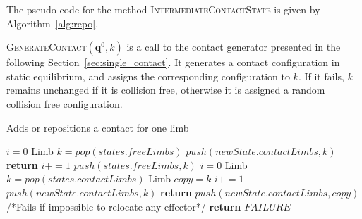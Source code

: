 The pseudo code for the method \textsc{IntermediateContactState} is given by Algorithm~\ref{alg:repo}.


\textsc{GenerateContact}$(\mathbf{q}^0,k)$ is a call to the contact generator presented in the following Section~\ref{sec:single_contact}.
 It generates a contact configuration in static equilibrium, and assigns the corresponding configuration to $k$.
If it fails, $k$ remains unchanged if it is collision free, otherwise it is assigned a random collision free configuration.



\begin{algorithm}[!tbp]
\caption{Adds or repositions a contact for one limb} \label{interpolate}
	\begin{algorithmic}[1]
		\State $i=0$
			\State Limb $k = pop(states.freeLimbs)$
				\State $push(newState.contactLimbs,k)$			
				\State \textbf{return}
			\Else
				\State $i+=1$
				\State $push(states.freeLimbs,k)$		
			\EndIf
		\EndWhile
		\State $i=0$
			\State Limb $k = pop(states.contactLimbs)$
			\State Limb $copy = k$
			\State $i+=1$
				\State $push(newState.contactLimbs,k)$			
				\State \textbf{return}
			\Else
				\State $push(newState.contactLimbs,copy)$	
			\EndIf
		\EndWhile
		/*Fails if impossible to relocate any effector*/
		\State \textbf{return} $FAILURE$
	\EndFunction
\end{algorithmic}
\label{alg:repo}
\end{algorithm}

